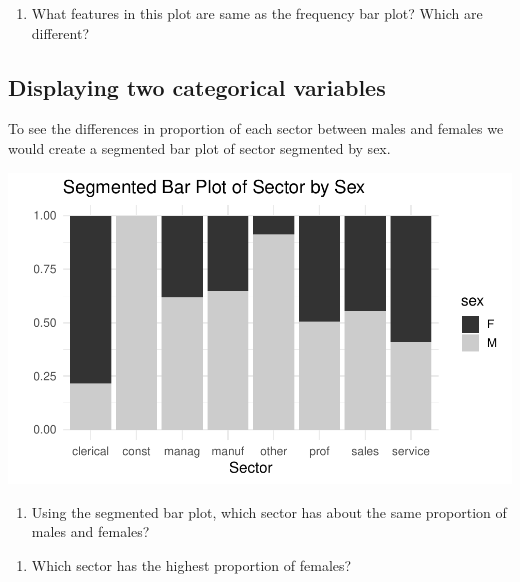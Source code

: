 \documentclass[
]{report}
\providecommand{\tightlist}{%
  \setlength{\itemsep}{0pt}\setlength{\parskip}{0pt}}
\begin{document}
\begin{enumerate}
\def\labelenumi{\arabic{enumi}.}
\setcounter{enumi}{4}
\tightlist
\item
  What features in this plot are same as the frequency bar plot? Which are different?
\end{enumerate}

\newpage

\hypertarget{displaying-two-categorical-variables}{%
\subsection{Displaying two categorical variables}\label{displaying-two-categorical-variables}}

To see the differences in proportion of each sector between males and females we would create a segmented bar plot of sector segmented by sex.

\begin{center}\includegraphics[width=0.7\linewidth]{03-EDA-categorical_files/figure-latex/unnamed-chunk-5-1} \end{center}

\begin{enumerate}
\def\labelenumi{\arabic{enumi}.}
\setcounter{enumi}{5}
\tightlist
\item
  Using the segmented bar plot, which sector has about the same proportion of males and females?
\end{enumerate}

\vspace{0.5in}

\begin{enumerate}
\def\labelenumi{\arabic{enumi}.}
\setcounter{enumi}{6}
\tightlist
\item
  Which sector has the highest proportion of females?
\end{enumerate}

\vspace{0.5in}
\end{document}
